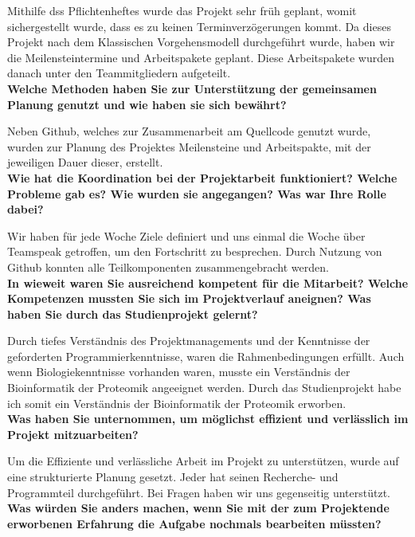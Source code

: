 Mithilfe dss Pflichtenheftes wurde das Projekt sehr früh geplant, womit sichergestellt wurde, dass es zu keinen Terminverzögerungen kommt. Da dieses Projekt nach dem Klassischen Vorgehensmodell durchgeführt wurde, haben wir die Meilensteintermine und Arbeitspakete geplant. Diese Arbeitspakete wurden danach unter den Teammitgliedern aufgeteilt.
\\

\textbf{Welche Methoden haben Sie zur Unterstützung der gemeinsamen Planung genutzt
und wie haben sie sich bewährt?}

Neben Github, welches zur Zusammenarbeit am Quellcode genutzt wurde, wurden zur Planung des Projektes Meilensteine und Arbeitspakte, mit der jeweiligen Dauer dieser, erstellt.
\\

\textbf{Wie hat die Koordination bei der Projektarbeit funktioniert? Welche Probleme gab
es? Wie wurden sie angegangen? Was war Ihre Rolle dabei?}

Wir haben für jede Woche Ziele definiert und uns einmal die Woche über Teamspeak getroffen, um den Fortschritt zu besprechen. Durch Nutzung von Github konnten alle Teilkomponenten zusammengebracht werden.
\\

\textbf{In wieweit waren Sie ausreichend kompetent für die Mitarbeit? Welche Kompetenzen
mussten Sie sich im Projektverlauf aneignen? Was haben Sie durch das
Studienprojekt gelernt?}

Durch tiefes Verständnis des Projektmanagements und der Kenntnisse der geforderten Programmierkenntnisse, waren die Rahmenbedingungen erfüllt. Auch wenn Biologiekenntnisse vorhanden waren, musste ein Verständnis der Bioinformatik der Proteomik angeeignet werden. Durch das Studienprojekt habe ich somit ein Verständnis der Bioinformatik der Proteomik erworben.
\\

\textbf{Was haben Sie unternommen, um möglichst effizient und verlässlich im Projekt
mitzuarbeiten?}

Um die Effiziente und verlässliche Arbeit im Projekt zu unterstützen, wurde auf eine strukturierte Planung gesetzt. Jeder hat seinen Recherche- und Programmteil durchgeführt. Bei Fragen haben wir uns gegenseitig unterstützt. 
\\

\textbf{Was würden Sie anders machen, wenn Sie mit der zum Projektende erworbenen
Erfahrung die Aufgabe nochmals bearbeiten müssten?}

